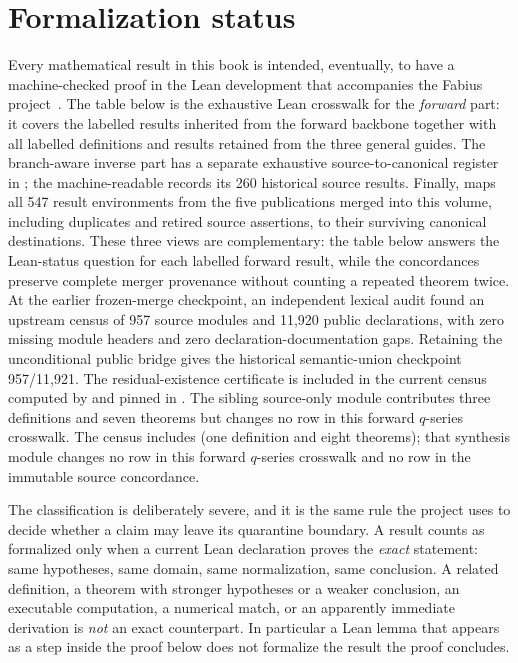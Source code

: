 \documentclass[11pt,a4paper,oneside,openany]{book}
\theoremstyle{definition}
\theoremstyle{remark}
\begin{document}
\chapter{Formalization status}\label{app:lean-status}

Every mathematical result in this book is intended, eventually, to have a
machine-checked proof in the Lean development that accompanies the Fabius
project~\cite{ReshetnikovProveIt2026}.  The table below is the exhaustive Lean
crosswalk for the \emph{forward} part: it covers the labelled results inherited
from the forward backbone together with all labelled definitions and results
retained from the three general guides.  The branch-aware inverse part has a
separate exhaustive source-to-canonical register in
; the machine-readable
 records its 260 historical source results.
Finally,  maps all 547 result environments from
the five publications merged into this volume, including duplicates and
retired source assertions, to their surviving canonical destinations.  These
three views are complementary: the table below answers the Lean-status
question for each labelled forward result, while the concordances preserve
complete merger provenance without counting a repeated theorem twice.
At the earlier frozen-merge checkpoint, an independent lexical audit found
an upstream census of 957 source modules and 11,920 public declarations, with zero missing module
headers and zero declaration-documentation gaps.  Retaining the unconditional
public  bridge gives the
historical semantic-union checkpoint 957/11,921.  The residual-existence
certificate  is included in the
current census computed by  and pinned in
.  The sibling source-only
 module contributes three definitions
and seven theorems but changes no row in this forward \(q\)-series crosswalk.
The census includes  (one
definition and eight theorems); that synthesis module changes no row in this
forward \(q\)-series crosswalk and no row in the immutable source
concordance.

The classification is deliberately severe, and it is the same rule the
project uses to decide whether a claim may leave its quarantine boundary.
A result counts as formalized only when a current Lean declaration proves
the \emph{exact} statement: same hypotheses, same domain, same
normalization, same conclusion.  A related definition, a theorem with
stronger hypotheses or a weaker conclusion, an executable computation, a
numerical match, or an apparently immediate derivation is \emph{not} an
exact counterpart.  In particular a Lean lemma that appears as a step
inside the proof below does not formalize the result the proof concludes.
\end{document}
